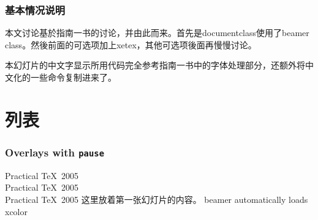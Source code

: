 \documentclass[xetex,aspectratio=169]{mybeamer}
\begin{document}
%
%
%


\begin{frame}
\frametitle{基本情况说明}
本文讨论基於\XeLaTeX 指南一书的讨论，并由此而来。首先是documentclass使用了beamer class。然後前面的可选项加上xetex，其他可选项後面再慢慢讨论。 

本幻灯片的中文字显示所用代码完全参考\XeLaTeX 指南一书中的字体处理部分，还额外将中文化的一些命令复制进来了。
\end{frame}


\section{列表}
\begin{frame}
\frametitle{Overlays with {\tt pause}}
Practical \TeX\ 2005\\  \pause
Practical \TeX\ 2005\\ \pause
Practical \TeX\ 2005
这里放着第一张幻灯片的内容。 beamer automatically loads xcolor
\end{frame}
\end{document}
